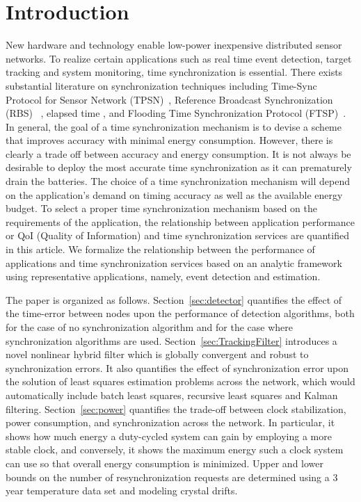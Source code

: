 \section{Introduction}
New hardware and technology enable low-power inexpensive
distributed sensor networks. To realize certain applications such as
real time event detection, target tracking and system monitoring,
time synchronization is essential. There exists substantial literature on 
synchronization techniques including Time-Sync
Protocol for Sensor Network (TPSN)~\cite{ganeriwal03timingsync},
Reference Broadcast Synchronization (RBS)
~\cite{elson02finegrained}, elapsed time \cite{kusy05elapsed}, and Flooding Time Synchronization Protocol (FTSP)~\cite{maroti2004ftsp}.
In general, the goal of a time synchronization mechanism is to
devise a scheme that improves accuracy with minimal energy
consumption. However, there is clearly a trade off between accuracy and
energy consumption. It is not always be desirable to deploy the
most accurate time synchronization as it can prematurely drain the batteries. The
choice of a time synchronization mechanism will depend on the
application's demand on timing accuracy as well as the available energy
budget. To select a proper time
synchronization mechanism based on the requirements of the application, the relationship between application
performance or QoI (Quality of Information) and time synchronization
services are quantified in this article. We
formalize the relationship between the performance of applications
and time synchronization services based on an analytic framework using
representative applications, namely, event detection and estimation.

The paper is organized as follows. Section~\ref{sec:detector} quantifies the effect of the time-error between nodes upon the performance of detection algorithms, both for the case of no synchronization algorithm and for the case where synchronization algorithms are used. Section~\ref{sec:TrackingFilter} introduces a novel nonlinear hybrid filter which is globally convergent and robust to synchronization errors. It also quantifies the effect of synchronization error upon the solution of least squares estimation problems across the network, which would automatically include batch least squares, recursive least squares and Kalman filtering. Section~\ref{sec:power} quantifies the trade-off between clock stabilization, power consumption, and synchronization across the network. In particular, it shows how much energy a duty-cycled system can gain by employing
a more stable clock, and conversely, it shows the maximum energy such a
clock system can use so that overall energy consumption is minimized. Upper and lower bounds on the number of resynchronization requests are determined using a 3 year temperature data set and modeling crystal drifts.



